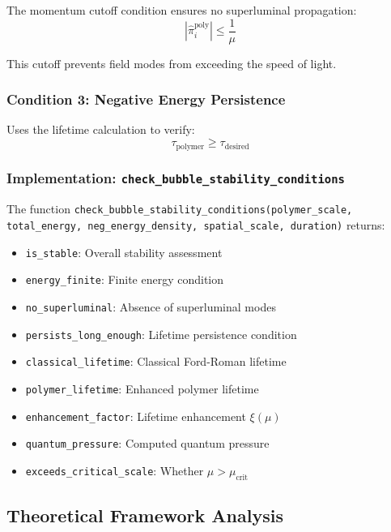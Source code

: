 The momentum cutoff condition ensures no superluminal propagation:
\begin{equation}
|\hat{\pi}_i^{\text{poly}}| \leq \frac{1}{\mu}
\end{equation}

This cutoff prevents field modes from exceeding the speed of light.

\subsubsection{Condition 3: Negative Energy Persistence}

Uses the lifetime calculation to verify:
\begin{equation}
\tau_{\text{polymer}} \geq \tau_{\text{desired}}
\end{equation}

\subsubsection{Implementation: \texttt{check\_bubble\_stability\_conditions}}

The function \texttt{check\_bubble\_stability\_conditions(polymer\_scale, total\_energy, neg\_energy\_density, spatial\_scale, duration)} returns:

\begin{itemize}
\item \texttt{is\_stable}: Overall stability assessment
\item \texttt{energy\_finite}: Finite energy condition
\item \texttt{no\_superluminal}: Absence of superluminal modes
\item \texttt{persists\_long\_enough}: Lifetime persistence condition
\item \texttt{classical\_lifetime}: Classical Ford-Roman lifetime
\item \texttt{polymer\_lifetime}: Enhanced polymer lifetime
\item \texttt{enhancement\_factor}: Lifetime enhancement $\xi(\mu)$
\item \texttt{quantum\_pressure}: Computed quantum pressure
\item \texttt{exceeds\_critical\_scale}: Whether $\mu > \mu_{\text{crit}}$
\end{itemize}

\subsection{Theoretical Framework Analysis}


